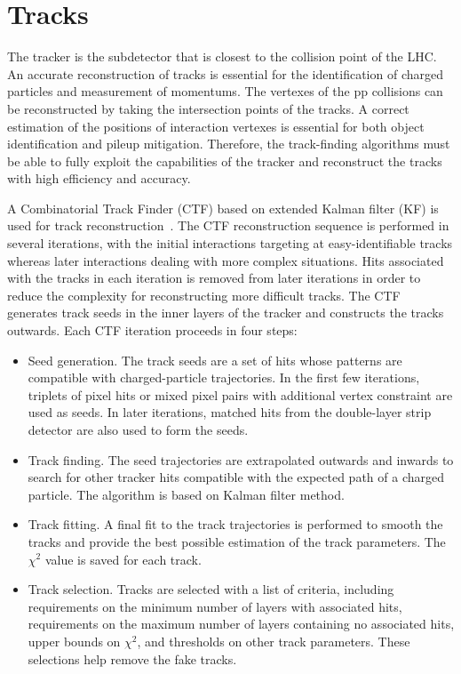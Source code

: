 \documentclass[thesis.tex]{subfiles}
\begin{document}
\section{Tracks}
The tracker is the subdetector that is closest to the collision point of the LHC. 
An accurate reconstruction of tracks is essential for the identification of charged particles and measurement of momentums. 
The vertexes of the pp collisions can be reconstructed by taking the intersection points of the tracks.
A correct estimation of the positions of interaction vertexes is essential for both object identification and pileup mitigation.
Therefore, the track-finding algorithms must be able to fully exploit the capabilities of the tracker and reconstruct the tracks with high efficiency and accuracy. 

A Combinatorial Track Finder (CTF) based on extended Kalman filter (KF) is used for track reconstruction~\cite{TrackPF}. 
The CTF reconstruction sequence is performed in several iterations, with the initial interactions targeting at easy-identifiable tracks whereas later interactions dealing with more complex situations. 
Hits associated with the tracks in each iteration is removed from later iterations in order to reduce the complexity for reconstructing more difficult tracks. 
The CTF generates track seeds in the inner layers of the tracker and constructs the tracks outwards. 
Each CTF iteration proceeds in four steps:

\begin{itemize}
	\item Seed generation. The track seeds are a set of hits whose patterns are compatible with charged-particle trajectories. 
		In the first few iterations, triplets of pixel hits or mixed pixel pairs with additional vertex constraint are used as seeds. 
		In later iterations, matched hits from the double-layer strip detector are also used to form the seeds. 
	\item Track finding. The seed trajectories are extrapolated outwards and inwards to search for other tracker hits compatible with the expected path of a charged particle. The algorithm is based on Kalman filter method. 
	\item Track fitting. A final fit to the track trajectories is performed to smooth the tracks and provide the best possible estimation of the track parameters. The $\chi^2$ value is saved for each track.
	\item Track selection. Tracks are selected with a list of criteria, including requirements on the minimum number of layers with associated hits, requirements on the maximum number of layers containing no associated hits, upper bounds on $\chi^2$, and thresholds on other track parameters. These selections help remove the fake tracks. 
\end{itemize}
\end{document}
